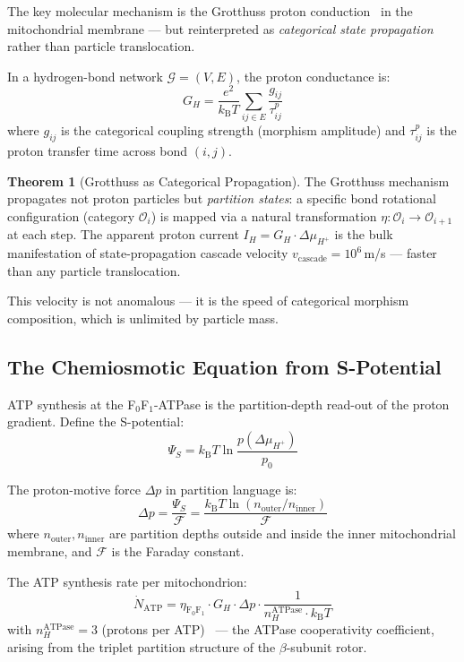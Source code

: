 \documentclass[10pt,twocolumn,a4paper]{article}
\theoremstyle{definition}
\newtheorem{theorem}{Theorem}
\newcommand{\kBT}{k_{\text{B}}T}
\newcommand{\calO}{\mathcal{O}}
\begin{document}
The key molecular mechanism is the Grotthuss proton conduction~\cite{grotthuss1806memoire,agmon1995grotthuss} in the
mitochondrial membrane --- but reinterpreted as \emph{categorical state propagation}
rather than particle translocation.

In a hydrogen-bond network $\mathcal{G} = (V, E)$, the proton conductance is:
\begin{equation}
\boxed{G_H = \frac{e^2}{\kBT} \sum_{ij \in E} \frac{g_{ij}}{\tau^p_{ij}}}
\end{equation}
where $g_{ij}$ is the categorical coupling strength (morphism amplitude) and
$\tau^p_{ij}$ is the proton transfer time across bond $(i,j)$.

\begin{theorem}[Grotthuss as Categorical Propagation]
The Grotthuss mechanism propagates not proton particles but \emph{partition states}:
a specific bond rotational configuration (category $\calO_i$) is mapped
via a natural transformation $\eta: \calO_i \to \calO_{i+1}$ at each step.
The apparent proton current $I_H = G_H \cdot \Delta\mu_{H^+}$ is the
bulk manifestation of state-propagation cascade velocity
$v_{\text{cascade}} = 10^6$\,m/s — faster than any particle translocation.
\end{theorem}

This velocity is not anomalous — it is the speed of categorical morphism
composition, which is unlimited by particle mass.

\subsection{The Chemiosmotic Equation from S-Potential}

ATP synthesis at the F$_0$F$_1$-ATPase is the partition-depth read-out of
the proton gradient. Define the S-potential:
\begin{equation}
\Psi_S = \kBT \ln \frac{p(\Delta\mu_{H^+})}{p_0}
\end{equation}

The proton-motive force $\Delta p$ in partition language is:
\begin{equation}
\Delta p = \frac{\Psi_S}{\mathcal{F}} = \frac{\kBT \ln(n_{\text{outer}}/n_{\text{inner}})}{\mathcal{F}}
\end{equation}
where $n_{\text{outer}}, n_{\text{inner}}$ are partition depths outside and inside
the inner mitochondrial membrane, and $\mathcal{F}$ is the Faraday constant.

The ATP synthesis rate per mitochondrion:
\begin{equation}
\dot{N}_{\text{ATP}} = \eta_{\text{F}_0\text{F}_1} \cdot G_H \cdot \Delta p \cdot \frac{1}{n_H^{\text{ATPase}} \cdot \kBT}
\end{equation}
with $n_H^{\text{ATPase}} = 3$ (protons per ATP)~\cite{boyer1997atp,stock1999molecular} --- the ATPase cooperativity
coefficient, arising from the triplet partition structure of the $\beta$-subunit rotor.
\end{document}
